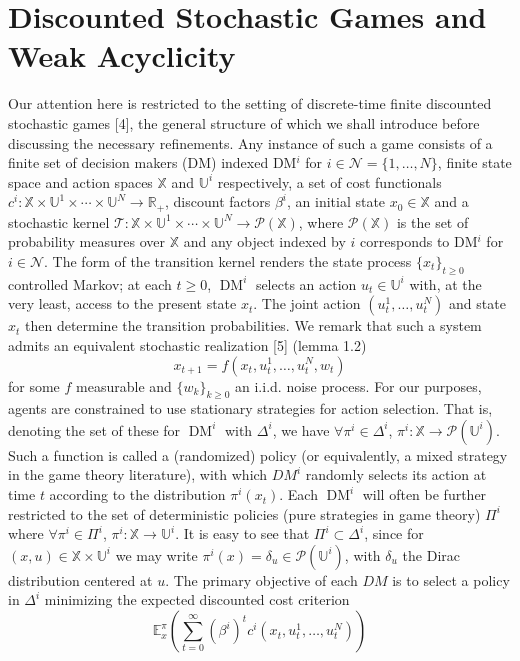 \documentclass[10pt]{article}
\newcommand{\E}{\mathbb{E}}
\newcommand{\bp}[1]{\left({#1}\right)}
\newcommand{\mbb}[1]{\mathbb{#1}}
\newcommand{\1}[1]{\mathbbm{1}_{#1}}
\newcommand{\mc}[1]{\mathcal{#1}}
\DeclareMathOperator{\DM}{DM}
\begin{document}
\section*{Discounted Stochastic Games and Weak Acyclicity}
Our attention here is restricted to the setting of discrete-time finite discounted stochastic games [4], the general structure of which we shall introduce before discussing the necessary refinements. Any instance of such a game consists of a finite set of decision makers (DM) indexed DM$^i$ for $i\in\mathcal{N}=\{1,\dots,N\}$,
finite state space and action spaces $\mbb{X}$ and $\mbb{U}^i$ respectively, a set of cost functionals $c^i:\mbb{X}\times\mbb{U}^1\times\cdots\times\mbb{U}^N\rightarrow\mbb{R}_+$, discount factors $\beta^i$, an initial state $x_0\in\mbb{X}$ and a
stochastic kernel $\mc{T}:\mbb{X}\times\mbb{U}^1\times\cdots\times\mbb{U}^N\rightarrow\mc{P}(\mbb{X})$, where $\mc{P}(\mbb{X})$ is the set of probability measures over $\mbb{X}$ and any object indexed by $i$ corresponds to DM$^i$ for $i\in\mc{N}$.
The form of the transition kernel renders the state process $\{x_t\}_{t\geq 0}$ controlled Markov; at each $t\geq 0$, $\DM^i$ selects an action $u_t\in\mbb{U}^i$ with, at the very least, access to the present state $x_t$. The joint action $(u^1_t,\dots,u^N_t)$ and state $x_t$ then
determine the transition probabilities. We remark that such a system admits an equivalent stochastic realization [5] (lemma 1.2)
\[x_{t+1}=f(x_t,u^1_t,\dots,u^N_t,w_t)\]
for some $f$ measurable and $\{w_k\}_{k\geq 0}$ an i.i.d. noise process. For our purposes, agents are constrained to use stationary strategies for action selection. That is, denoting the set of these for $\DM^i$ with $\Delta^i$, we have $\forall \pi^i\in\Delta^i$, $\pi^i:\mbb{X}\rightarrow\mc{P}(\mbb{U}^i)$. Such a function is called a (randomized) policy (or equivalently, a mixed strategy in the game theory literature), with which $DM^i$ randomly selects its action at time $t$ according to the distribution $\pi^i(x_t)$.
Each $\DM^i$ will often be further restricted to the set of deterministic policies (pure strategies in game theory) $\Pi^i$ where $\forall \pi^i\in\Pi^i$, $\pi^i:\mbb{X}\rightarrow\mbb{U}^i$. It is easy to see that $\Pi^i\subset\Delta^i$, since for $(x,u)\in\mbb{X}\times\mbb{U}^i$ we may write $\pi^i(x)=\delta_{u}\in\mc{P}(\mbb{U}^i)$, with $\delta_u$ the Dirac distribution centered at $u$.
The primary objective of each $DM$ is to select a policy in $\Delta^i$ minimizing the expected discounted cost criterion 
\[\E_x^\pi\bp{\sum_{t=0}^\infty(\beta^i)^tc^i(x_t,u^1_t,\dots,u^N_t)}\tag{1}\]
\end{document}
